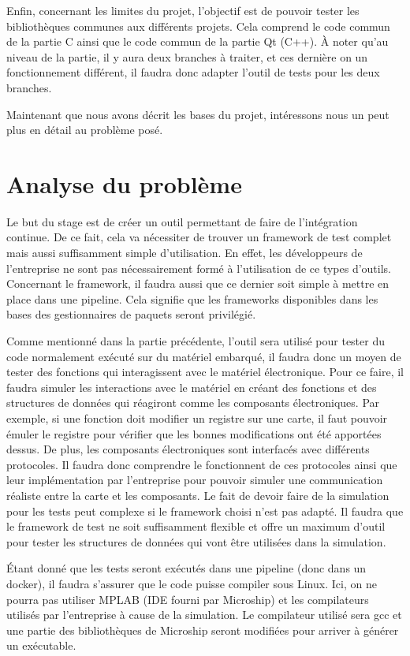 \documentclass[a4paper]{article}
\begin{document}
Enfin, concernant les limites du projet, l'objectif est de pouvoir tester les
bibliothèques communes aux différents projets. Cela comprend le code commun de
la partie C ainsi que le code commun de la partie Qt (C++). À noter qu'au niveau
de la partie, il y aura deux branches à traiter, et ces dernière on un
fonctionnement différent, il faudra donc adapter l'outil de tests pour les deux
branches.

Maintenant que nous avons décrit les bases du projet, intéressons nous un peut
plus en détail au problème posé.
\section{Analyse du problème}%

Le but du stage est de créer un outil permettant de faire de l'intégration
continue. De ce fait, cela va nécessiter de trouver un framework de test complet
mais aussi suffisamment simple d'utilisation. En effet, les développeurs de
l'entreprise ne sont pas nécessairement formé à l'utilisation de ce types
d'outils. Concernant le framework, il faudra aussi que ce dernier soit simple à
mettre en place dans une pipeline. Cela signifie que les frameworks disponibles
dans les bases des gestionnaires de paquets seront privilégié.

Comme mentionné dans la partie précédente, l'outil sera utilisé pour tester du
code normalement exécuté sur du matériel embarqué, il faudra donc un moyen de
tester des fonctions qui interagissent avec le matériel électronique. Pour ce
faire, il faudra simuler les interactions avec le matériel en créant des
fonctions et des structures de données qui réagiront comme les composants
électroniques. Par exemple, si une fonction doit modifier un registre sur une
carte, il faut pouvoir émuler le registre pour vérifier que les bonnes
modifications ont été apportées dessus. De plus, les composants électroniques
sont interfacés avec différents protocoles. Il faudra donc comprendre le
fonctionnent de ces protocoles ainsi que leur implémentation par l'entreprise
pour pouvoir simuler une communication réaliste entre la carte et les
composants. Le fait de devoir faire de la simulation pour les tests peut
complexe si le framework choisi n'est pas adapté. Il faudra que le framework de
test ne soit suffisamment flexible et offre un maximum d'outil pour tester les
structures de données qui vont être utilisées dans la simulation.

Étant donné que les tests seront exécutés dans une pipeline (donc dans un
docker), il faudra s'assurer que le code puisse compiler sous Linux. Ici, on ne
pourra pas utiliser MPLAB (IDE fourni par Microship) et les compilateurs
utilisés par l'entreprise à cause de la simulation. Le compilateur utilisé sera
gcc et une partie des bibliothèques de Microship seront modifiées pour arriver à
générer un exécutable.
\end{document}
